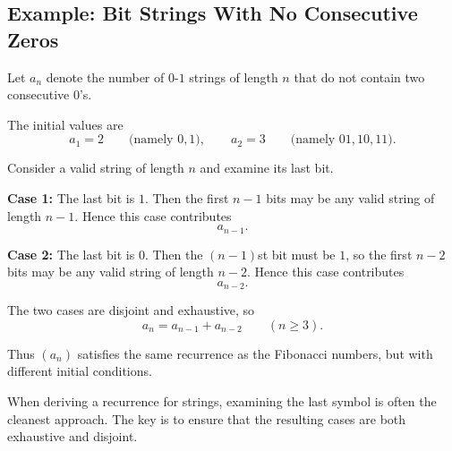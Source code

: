 \subsection{Example: Bit Strings With No Consecutive Zeros}

Let $a_n$ denote the number of $0$-$1$ strings of length $n$ that do not contain two consecutive $0$'s.

The initial values are
\[
a_1=2
\qquad\text{(namely $0,1$)},
\qquad
 a_2=3
\qquad\text{(namely $01,10,11$)}.
\]

\begin{examplebox}[title={Recurrence for strings with no consecutive zeros}]
Consider a valid string of length $n$ and examine its last bit.

\textbf{Case 1:} The last bit is $1$.
Then the first $n-1$ bits may be any valid string of length $n-1$. Hence this case contributes
\[
a_{n-1}.
\]

\textbf{Case 2:} The last bit is $0$.
Then the $(n-1)$st bit must be $1$, so the first $n-2$ bits may be any valid string of length $n-2$. Hence this case contributes
\[
a_{n-2}.
\]

The two cases are disjoint and exhaustive, so
\[
a_n=a_{n-1}+a_{n-2}
\qquad (n\ge 3).
\]
\end{examplebox}

\begin{center}
\end{center}

Thus $(a_n)$ satisfies the same recurrence as the Fibonacci numbers, but with different initial conditions.

\begin{examtip}[title={Standard last-symbol strategy}]
When deriving a recurrence for strings, examining the last symbol is often the cleanest approach. The key is to ensure that the resulting cases are both exhaustive and disjoint.
\end{examtip}

